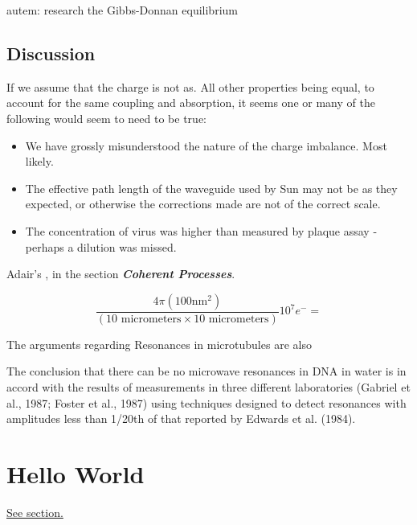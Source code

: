 \documentclass[paper.tex]{subfiles}
\begin{document}
\begin{autem}
	autem: research the Gibbs-Donnan equilibrium
\end{autem}


\subsection{Discussion}

If we assume that the charge is not as. All other properties being equal, to account for the same coupling and absorption, it seems one or many of the following would seem to need to be true:

\begin{itemize}
\item We have grossly misunderstood the nature of the charge imbalance. Most likely.
\item The effective path length of the waveguide used by Sun may not be as they expected, or otherwise the corrections made are not of the correct scale.
\item The concentration of virus was higher than measured by plaque assay - perhaps a dilution was missed.
\end{itemize}







Adair's \cite{Vibrational2002}, in the section {\it \bf Coherent Processes}. 

$$\frac{4 \pi (100 \text{nm}^2)}{(10 \text{ micrometers} \times 10 \text{ micrometers})} 10^7 e^- = $$

The arguments regarding Resonances in microtubules are also 

\cite{Vibrational2002}
The conclusion that there can be no microwave resonances in DNA in water is in accord with the results of
measurements in three different laboratories (Gabriel et al.,
1987; Foster et al., 1987) using techniques designed to
detect resonances with amplitudes less than 1/20th of that
reported by Edwards et al. (1984).






\section{Hello World}
\label{sec:hello}
\hyperref[sec:hello]{See section.}
\end{document}

